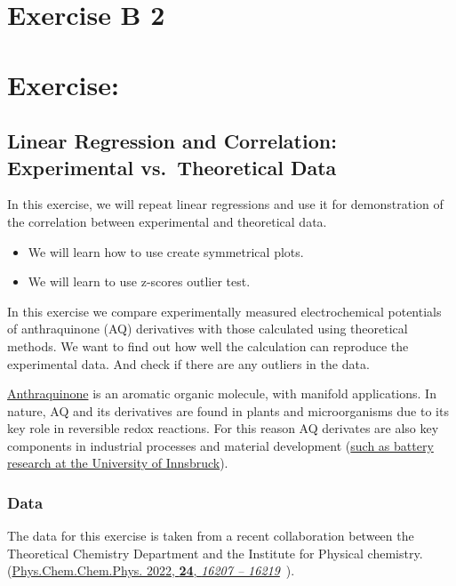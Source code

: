 \documentclass[
  letterpaper,
  DIV=11,
  numbers=noendperiod]{scrreprt}
\providecommand{\tightlist}{%
  \setlength{\itemsep}{0pt}\setlength{\parskip}{0pt}}\usepackage{longtable,booktabs,array}
\begin{document}
\chapter{Exercise B 2}\label{exercise-b-2}

\chapter{Exercise:}\label{exercise-2}

\section{Linear Regression and Correlation: Experimental vs.~Theoretical
Data}\label{linear-regression-and-correlation-experimental-vs.-theoretical-data}

In this exercise, we will repeat linear regressions and use it for
demonstration of the correlation between experimental and theoretical
data.

\begin{itemize}
\tightlist
\item
  We will learn how to use create symmetrical plots.
\item
  We will learn to use z-scores outlier test.
\end{itemize}

In this exercise we compare experimentally measured electrochemical
potentials of anthraquinone (AQ) derivatives with those calculated using
theoretical methods. We want to find out how well the calculation can
reproduce the experimental data. And check if there are any outliers in
the data.

\href{https://en.wikipedia.org/wiki/Anthraquinone}{Anthraquinone} is an
aromatic organic molecule, with manifold applications. In nature, AQ and
its derivatives are found in plants and microorganisms due to its key
role in reversible redox reactions. For this reason AQ derivates are
also key components in industrial processes and material development
(\href{https://www.uibk.ac.at/de/physchem/forschung/batterietechnologien/}{such
as battery research at the University of Innsbruck}).

\subsection{Data}\label{data-2}

The data for this exercise is taken from a recent collaboration between
the Theoretical Chemistry Department and the Institute for Physical
chemistry.
(\href{https://pubs.rsc.org/en/content/articlehtml/2022/cp/d2cp01717b}{Phys.Chem.Chem.Phys.
2022, \textbf{24}, \emph{16207 -- 16219}}~).
\end{document}
